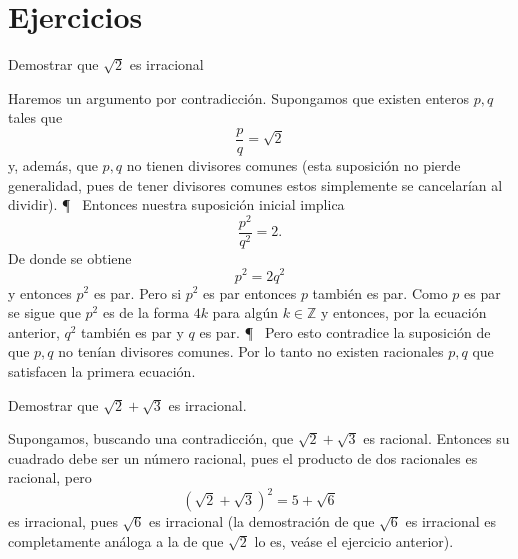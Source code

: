 \section{Ejercicios}%
\label{sec:ejercicios_reales}

\begin{ejer}
	Demostrar que $ \sqrt{2} $ es irracional
	\begin{sol}
		Haremos un argumento por contradicción. Supongamos
		que existen enteros $ p,q $ tales que
		\[
			\frac{p}{q} = \sqrt{2}
		\]
		y, además, que $ p,q $ no tienen divisores comunes
		(esta suposición no pierde generalidad, pues de tener
		divisores comunes estos simplemente se cancelarían al 
		dividir).
\P~
		Entonces nuestra suposición inicial implica
		\[
		\frac{p^2}{q^2} = 2.
		\]
		De donde se obtiene
		\[
			p^{2} = 2 q^{2} 
		\]
		y entonces $ p^{2} $ es par. Pero si $ p^{2}  $ es par 
		entonces $ p $ también es par. Como $ p $ es par se sigue
		que $ p^{2}  $ es de la forma $ 4k $ para algún $k\in \mathbb{Z}$
		y entonces, por la ecuación anterior, $q^{2} $ también es par
		y $ q $ es par.
\P~
		Pero esto contradice la suposición de que $ p,q $ no tenían divisores
		comunes. Por lo tanto no existen racionales $ p,q $ que satisfacen
		la primera ecuación.
	\end{sol}
\end{ejer}

\begin{ejer}
	Demostrar que $ \sqrt{2}+\sqrt{3} $ es irracional. 
	\begin{sol}
	Supongamos, buscando una contradicción, que $ \sqrt{2}+ \sqrt{3} $ es racional.
	Entonces su cuadrado debe ser un número racional, pues el producto de 
	dos racionales es racional, pero
	\[
		 ( \sqrt{2}+\sqrt{3} )^2 = 5+ \sqrt{6}
	\]
	es irracional, pues $ \sqrt{6} $ es irracional (la demostración
	de que $ \sqrt{6} $ es irracional es completamente análoga a la de que
	$ \sqrt{2} $ lo es, veáse el ejercicio anterior).
	\end{sol}
\end{ejer}

